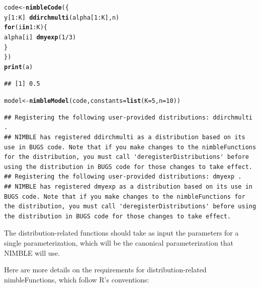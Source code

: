 \documentclass[12pt,oneside]{book}\usepackage[]{graphicx}\usepackage[]{color}
\makeatletter
\newcommand{\hlnum}[1]{\textcolor[rgb]{0.686,0.059,0.569}{#1}}%
\newcommand{\hlopt}[1]{\textcolor[rgb]{0,0,0}{#1}}%
\newcommand{\hlstd}[1]{\textcolor[rgb]{0.345,0.345,0.345}{#1}}%
\newcommand{\hlkwa}[1]{\textcolor[rgb]{0.161,0.373,0.58}{\textbf{#1}}}%
\newcommand{\hlkwb}[1]{\textcolor[rgb]{0.69,0.353,0.396}{#1}}%
\newcommand{\hlkwc}[1]{\textcolor[rgb]{0.333,0.667,0.333}{#1}}%
\newcommand{\hlkwd}[1]{\textcolor[rgb]{0.737,0.353,0.396}{\textbf{#1}}}%
\newenvironment{kframe}{%
 \def\at@end@of@kframe{}%
 \ifinner\ifhmode%
  \def\at@end@of@kframe{\end{minipage}}%
  \begin{minipage}{\columnwidth}%
 \fi\fi%
 \def\FrameCommand##1{\hskip\@totalleftmargin \hskip-\fboxsep
 \colorbox{shadecolor}{##1}\hskip-\fboxsep
     \hskip-\linewidth \hskip-\@totalleftmargin \hskip\columnwidth}%
 \MakeFramed {\advance\hsize-\width
   \@totalleftmargin\z@ \linewidth\hsize
   \@setminipage}}%
 {\par\unskip\endMakeFramed%
 \at@end@of@kframe}
\newenvironment{knitrout}{}{} %
\makeatother
\begin{document}
\begin{knitrout}
\begin{kframe}
\begin{alltt}
\hlstd{code} \hlkwb{<-} \hlkwd{nimbleCode}\hlstd{(\{}
     \hlstd{y[}\hlnum{1}\hlopt{:}\hlstd{K]} \hlopt{~} \hlkwd{ddirchmulti}\hlstd{(alpha[}\hlnum{1}\hlopt{:}\hlstd{K], n)}
     \hlkwa{for}\hlstd{(i} \hlkwa{in} \hlnum{1}\hlopt{:}\hlstd{K) \{}
         \hlstd{alpha[i]} \hlopt{~} \hlkwd{dmyexp}\hlstd{(}\hlnum{1}\hlopt{/}\hlnum{3}\hlstd{)}
      \hlstd{\}}
     \hlstd{\})}
\hlkwd{print}\hlstd{(a)}
\end{alltt}
\begin{verbatim}
## [1] 0.5
\end{verbatim}
\begin{alltt}
\hlstd{model} \hlkwb{<-} \hlkwd{nimbleModel}\hlstd{(code,} \hlkwc{constants} \hlstd{=} \hlkwd{list}\hlstd{(}\hlkwc{K} \hlstd{=} \hlnum{5}\hlstd{,} \hlkwc{n} \hlstd{=} \hlnum{10}\hlstd{))}
\end{alltt}
\begin{verbatim}
## Registering the following user-provided distributions: ddirchmulti .
## NIMBLE has registered ddirchmulti as a distribution based on its use in BUGS code. Note that if you make changes to the nimbleFunctions for the distribution, you must call 'deregisterDistributions' before using the distribution in BUGS code for those changes to take effect.
## Registering the following user-provided distributions: dmyexp .
## NIMBLE has registered dmyexp as a distribution based on its use in BUGS code. Note that if you make changes to the nimbleFunctions for the distribution, you must call 'deregisterDistributions' before using the distribution in BUGS code for those changes to take effect.
\end{verbatim}
\end{kframe}
\end{knitrout}

The distribution-related functions should take as input the parameters
for a single parameterization, which will be the canonical
parameterization that NIMBLE will use. 

Here are more details on the requirements for distribution-related nimbleFunctions, which follow R's conventions:
\end{document}
